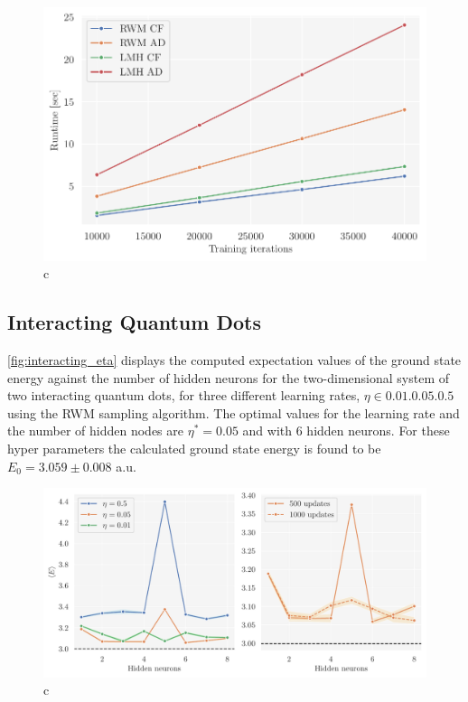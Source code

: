 \begin{figure}[!htb]
\begin{center}\includegraphics[scale=0.8]{latex/figures/runtimes.pdf}
\end{center}
\caption{c}
\label{fig:runtimes}
\end{figure}

\FloatBarrier

\subsection{Interacting Quantum Dots}

\autoref{fig:interacting_eta} displays the computed expectation values of the ground state energy against the number of hidden neurons for the two-dimensional system of two interacting quantum dots, for three different learning rates, $\eta\in\qty{0.01, 0.05, 0.5}$ using the RWM sampling algorithm. The optimal values for the learning rate and the number of hidden nodes are $\eta^{*}=0.05$ and with $6$ hidden neurons. For these hyper parameters the calculated ground state energy is found to be $E_0 = 3.059\pm0.008$ a.u. 

\begin{figure}[!htb]
\begin{center}\includegraphics[width=\textwidth]{latex/figures/interacting_eta.pdf}
\end{center}
\caption{c}
\label{fig:interacting_eta}
\end{figure}

